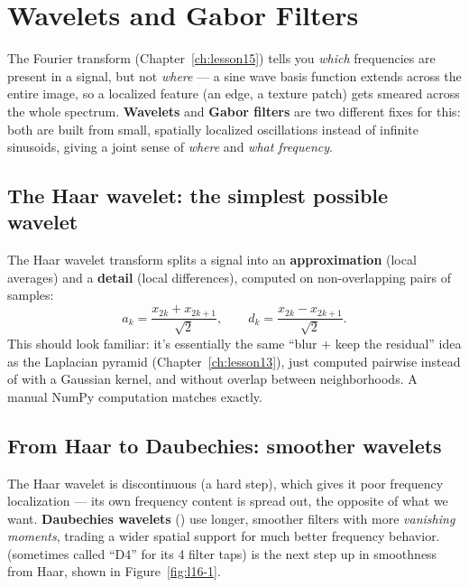 \chapter{Wavelets and Gabor Filters}
\label{ch:lesson16}

The Fourier transform (Chapter~\ref{ch:lesson15}) tells you \emph{which} frequencies are present in a signal, but not \emph{where} --- a sine wave basis function extends across the entire image, so a localized feature (an edge, a texture patch) gets smeared across the whole spectrum. \textbf{Wavelets} and \textbf{Gabor filters} are two different fixes for this: both are built from small, spatially localized oscillations instead of infinite sinusoids, giving a joint sense of \emph{where} and \emph{what frequency}.

\section{The Haar wavelet: the simplest possible wavelet}

The Haar wavelet transform splits a signal into an \textbf{approximation} (local averages) and a \textbf{detail} (local differences), computed on non-overlapping pairs of samples:
\begin{equation}
a_k = \frac{x_{2k} + x_{2k+1}}{\sqrt{2}}, \qquad d_k = \frac{x_{2k} - x_{2k+1}}{\sqrt{2}}.
\end{equation}
This should look familiar: it's essentially the same ``blur $+$ keep the residual'' idea as the Laplacian pyramid (Chapter~\ref{ch:lesson13}), just computed pairwise instead of with a Gaussian kernel, and without overlap between neighborhoods. A manual NumPy computation matches  exactly.

\section{From Haar to Daubechies: smoother wavelets}

The Haar wavelet is discontinuous (a hard step), which gives it poor frequency localization --- its own frequency content is spread out, the opposite of what we want. \textbf{Daubechies wavelets} () use longer, smoother filters with more \emph{vanishing moments}, trading a wider spatial support for much better frequency behavior.  (sometimes called ``D4'' for its 4 filter taps) is the next step up in smoothness from Haar, shown in Figure~\ref{fig:l16-1}.

